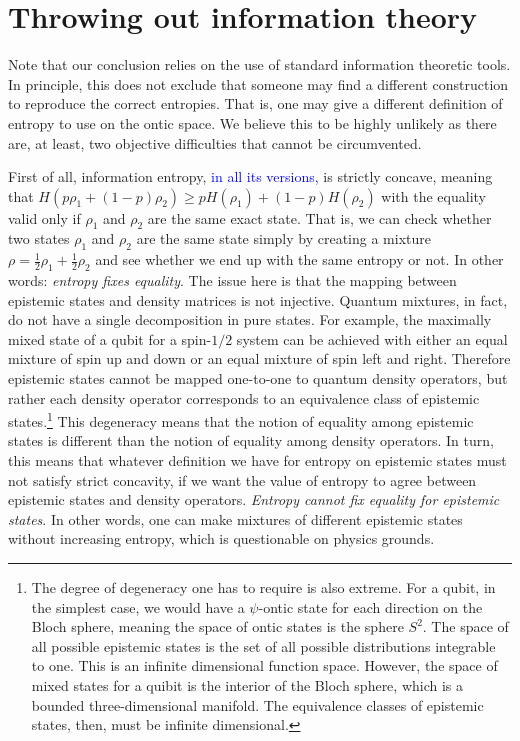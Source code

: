 \documentclass[10pt,twocolumn, nofootinbib]{revtex4-2}
\begin{document}
\section{Throwing out information theory}

Note that our conclusion relies on the use of standard information theoretic tools. In principle, this does not exclude that someone may find a different construction to reproduce the correct entropies. That is, one may give a different definition of entropy to use on the ontic space. We believe this to be highly unlikely as there are, at least, two objective difficulties that cannot be circumvented.

First of all, information entropy, \textcolor{blue}{in all its versions,} is strictly concave, meaning that $H(p \rho_1 + (1-p) \rho_2) \geq p H(\rho_1) + (1-p) H(\rho_2)$ with the equality valid only if $\rho_1$ and $\rho_2$ are the same exact state. That is, we can check whether two states $\rho_1$ and $\rho_2$ are the same state simply by creating a mixture $\rho = \frac{1}{2} \rho_1 + \frac{1}{2} \rho_2$ and see whether we end up with the same entropy or not. In other words: \emph{entropy fixes equality}.
The issue here is that the mapping between epistemic states and density matrices is not injective. Quantum mixtures, in fact, do not have a single decomposition in pure states. For example, the maximally mixed state of a qubit for a spin-$1/2$ system can be achieved with either an equal mixture of spin up and down or an equal mixture of spin left and right. Therefore epistemic states cannot be mapped one-to-one to quantum density operators, but rather each density operator corresponds to an equivalence class of epistemic states.\footnote{The degree of degeneracy one has to require is also extreme. For a qubit, in the simplest case, we would have a $\psi$-ontic state for each direction on the Bloch sphere, meaning the space of ontic states is the sphere $S^2$. The space of all possible epistemic states is the set of all possible distributions integrable to one. This is an infinite dimensional function space. However, the space of mixed states for a quibit is the interior of the Bloch sphere, which is a bounded three-dimensional manifold. The equivalence classes of epistemic states, then, must be infinite dimensional.} This degeneracy means that the notion of equality among epistemic states is different than the notion of equality among density operators. In turn, this means that whatever definition we have for entropy on epistemic states must not satisfy strict concavity, if we want the value of entropy to agree between epistemic states and density operators. \emph{Entropy cannot fix equality for epistemic states}. In other words, one can make mixtures of different epistemic states without increasing entropy, which is questionable on physics grounds.
\end{document}
